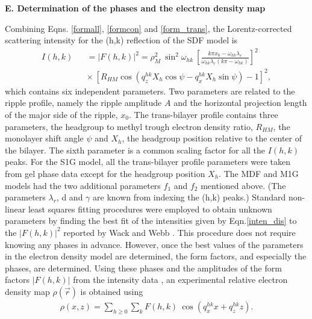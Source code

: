 
\vspace{0.128in}
\noindent
{\bf E. Determination of the phases and the electron density map}
\vspace{0.128in}

Combining Eqns. \ref{formall}, \ref{formcon} and \ref{form_trans}, the 
Lorentz-corrected scattering intensity for the (h,k) 
reflection of the SDF model is
\begin{eqnarray}
\label{inten_dis}
I(h,k) && = |F(h,k)|^2 
= \rho_M^2\ \sin^2 \omega_{hk}\ \left[\frac{k \pi x_0 -
\omega_{hk} \lambda_r}{\omega_{hk} \lambda_r (k \pi 
- \omega_{hk})} \right]^2 \nonumber\\
&& \times\ [R_{HM} \cos (q_z^{hk} X_h \cos \psi - q_x^{hk} X_h \sin \psi) -1]^2,
\end{eqnarray}
which contains six independent parameters.
Two parameters are related to the ripple profile, namely
the ripple amplitude $A$ and the horizontal projection length of the major side
of the ripple, $x_0$. The trans-bilayer profile contains three
parameters, the headgroup to methyl trough electron
density ratio, $R_{HM}$, the monolayer shift angle $\psi$ and $X_h$,
the headgroup position relative to the center of the bilayer. 
The sixth parameter is a common scaling factor for all the
$I(h,k)$ peaks.  For the S1G model, all the trans-bilayer profile parameters
were taken from gel phase data \cite{WSN89} except for the headgroup
position $X_h$.  The MDF and M1G models had the two additional parameters
$f_1$ and $f_2$ mentioned above.
(The parameters ${\lambda}_r$, d and $\gamma$ are known
from indexing the (h,k) peaks.)
Standard non-linear least squares fitting procedures were employed to
obtain unknown parameters by finding the best
fit of the intensities given by Eqn.\ref{inten_dis} to the $|F(h,k)|^2$ reported
by Wack and Webb \cite{Wac89a}. 
This procedure does not require knowing any phases in advance.  However,
once the best values of the parameters in the electron density model are
determined, the form factors, and especially the phases, are determined.
Using these phases and the amplitudes of the form factors $|F(h,k)|$ from 
the intensity data \cite{Wac89a},
an experimental relative electron density map $\rho(\vec{r})$ 
is obtained using
\begin{eqnarray}
\label{discretell}
\rho(x,z) = \sum_{h \geq 0} \sum_{k} F(h,k) \ \cos(q^{hk}_x x + q^{hk}_z z).
\end{eqnarray}
